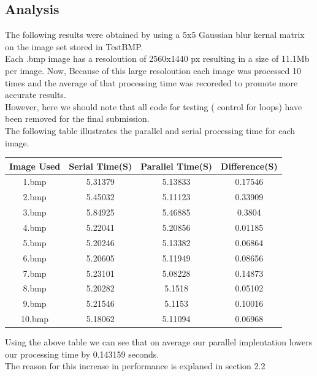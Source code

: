 \documentclass[paper=a4, fontsize=11pt]{scrartcl} %
\numberwithin{equation}{section} %
\numberwithin{figure}{section} %
\numberwithin{table}{section} %
\begin{document}
\subsection{Analysis}
The following results were obtained by using a 5x5 Gaussian blur kernal matrix on the image set stored in TestBMP.\\
Each .bmp image has a resoloution of 2560x1440 px resulting in a size of 11.1Mb per image. Now, Because of this large resoloution each image was processed 10 times and the average of that processing time was recoreded to promote more accurate results.\\


However, here we should note that all code for testing ( control for loops) have been removed for the final submission.\\

The following table illustrates the parallel and serial processing time for each image.\\

\begin{center}

\begin{tabular}{||c |c |c |c ||}
\hline
\textbf{Image Used} & \textbf{Serial Time(S)} & \textbf{Parallel Time(S)} & \textbf{Difference(S)} \\[0.5ex]
\hline \hline

1.bmp & 5.31379 & 5.13833 & 0.17546 \\
2.bmp & 5.45032 & 5.11123 & 0.33909\\
3.bmp & 5.84925 & 5.46885 & 0.3804\\
4.bmp & 5.22041 & 5.20856 & 0.01185\\
5.bmp & 5.20246 & 5.13382 & 0.06864\\
6.bmp & 5.20605 & 5.11949 & 0.08656\\
7.bmp & 5.23101 & 5.08228 & 0.14873\\
8.bmp & 5.20282 & 5.1518  & 0.05102\\
9.bmp & 5.21546 & 5.1153  & 0.10016\\
10.bmp & 5.18062 & 5.11094 & 0.06968\\[1ex]

\hline

\end{tabular}

\end{center}

Using the above table we can see that on average our parallel implentation lowers our processing time by 0.143159 seconds.\\
The reason for this increase in performance is explaned in section 2.2\\
\end{document}
